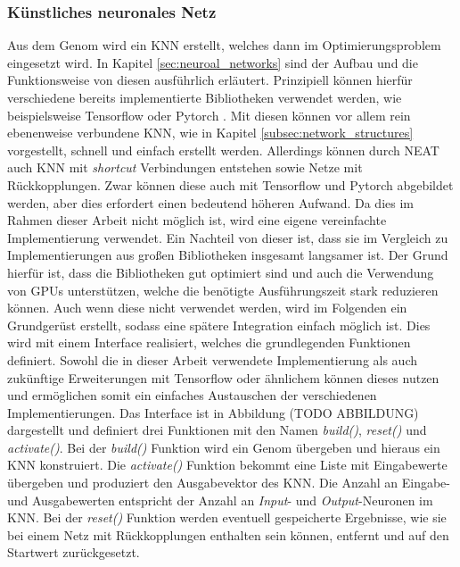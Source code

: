 \subsubsection{Künstliches neuronales Netz}
Aus dem Genom wird ein \ac{KNN} erstellt, welches dann im Optimierungsproblem eingesetzt wird. In Kapitel \ref{sec:neuroal_networks} sind der Aufbau und die Funktionsweise von diesen ausführlich erläutert. Prinzipiell können hierfür verschiedene bereits implementierte Bibliotheken verwendet werden, wie beispielsweise Tensorflow \cite{tensorflow2015} oder Pytorch \cite{pytorch2019}. Mit diesen können vor allem rein ebenenweise verbundene \ac{KNN}, wie in Kapitel \ref{subsec:network_structures} vorgestellt, schnell und einfach erstellt werden. Allerdings können durch \ac{NEAT} auch \ac{KNN} mit \emph{shortcut} Verbindungen entstehen sowie Netze mit Rückkopplungen. Zwar können diese  auch mit Tensorflow und Pytorch abgebildet werden, aber dies erfordert einen bedeutend höheren Aufwand. Da dies im Rahmen dieser Arbeit nicht möglich ist, wird eine eigene vereinfachte Implementierung verwendet. Ein Nachteil von dieser ist, dass sie im Vergleich zu Implementierungen aus großen Bibliotheken insgesamt langsamer ist. Der Grund hierfür ist, dass die Bibliotheken gut optimiert sind und auch die Verwendung von \acp{GPU} unterstützen, welche die benötigte Ausführungszeit stark reduzieren können. Auch wenn diese nicht verwendet werden, wird im Folgenden ein Grundgerüst erstellt, sodass eine spätere Integration einfach möglich ist. Dies wird mit einem Interface realisiert, welches die grundlegenden Funktionen definiert. Sowohl die in dieser Arbeit verwendete Implementierung als auch zukünftige Erweiterungen mit Tensorflow oder ähnlichem können dieses nutzen und ermöglichen somit ein einfaches Austauschen der verschiedenen Implementierungen. Das Interface ist in Abbildung (TODO ABBILDUNG) dargestellt und definiert drei Funktionen mit den Namen \emph{build()}, \emph{reset()} und \emph{activate()}. Bei der \emph{build()} Funktion wird ein Genom übergeben und hieraus ein \ac{KNN} konstruiert. Die \emph{activate()} Funktion bekommt eine Liste mit Eingabewerte übergeben und produziert den Ausgabevektor des \ac{KNN}. Die Anzahl an Eingabe- und Ausgabewerten entspricht der Anzahl an \emph{Input}- und \emph{Output}-Neuronen im \ac{KNN}. Bei der \emph{reset()} Funktion werden eventuell gespeicherte Ergebnisse, wie sie bei einem Netz mit Rückkopplungen enthalten sein können, entfernt und auf den Startwert zurückgesetzt. 
\\\\
